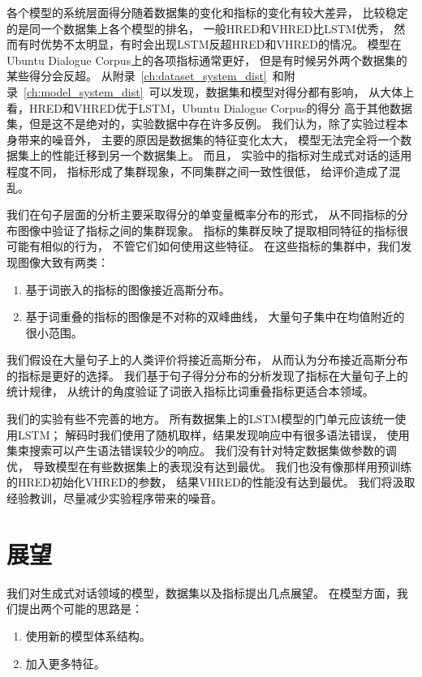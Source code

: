 各个模型的系统层面得分随着数据集的变化和指标的变化有较大差异，
比较稳定的是同一个数据集上各个模型的排名，
一般HRED和VHRED比LSTM优秀，
然而有时优势不太明显，有时会出现LSTM反超HRED和VHRED的情况。
模型在Ubuntu Dialogue Corpus上的各项指标通常更好，
但是有时候另外两个数据集的某些得分会反超。
从附录~\ref{ch:dataset_system_dist}~和附录~\ref{ch:model_system_dist}~可以发现，数据集和模型对得分都有影响，
从大体上看，HRED和VHRED优于LSTM，Ubuntu Dialogue Corpus的得分
高于其他数据集，但是这不是绝对的，实验数据中存在许多反例。
我们认为，除了实验过程本身带来的噪音外，
主要的原因是数据集的特征变化太大，
模型无法完全将一个数据集上的性能迁移到另一个数据集上。
而且，
实验中的指标对生成式对话的适用程度不同，
指标形成了集群现象，不同集群之间一致性很低，
给评价造成了混乱。

我们在句子层面的分析主要采取得分的单变量概率分布的形式，
从不同指标的分布图像中验证了指标之间的集群现象。
指标的集群反映了提取相同特征的指标很可能有相似的行为，
不管它们如何使用这些特征。
在这些指标的集群中，我们发现图像大致有两类：
\begin{enumerate}
    \item 基于词嵌入的指标的图像接近高斯分布。
    \item 基于词重叠的指标的图像是不对称的双峰曲线，
    大量句子集中在均值附近的很小范围。
\end{enumerate}
我们假设在大量句子上的人类评价将接近高斯分布，
从而认为分布接近高斯分布的指标是更好的选择。
我们基于句子得分分布的分析发现了指标在大量句子上的统计规律，
从统计的角度验证了词嵌入指标比词重叠指标更适合本领域。

我们的实验有些不完善的地方。
所有数据集上的LSTM模型的门单元应该统一使用LSTM；
解码时我们使用了随机取样，结果发现响应中有很多语法错误，
使用集束搜索可以产生语法错误较少的响应。
我们没有针对特定数据集做参数的调优，
导致模型在有些数据集上的表现没有达到最优。
我们也没有像\cite{VHRED}那样用预训练的HRED初始化VHRED的参数，
结果VHRED的性能没有达到最优。
我们将汲取经验教训，尽量减少实验程序带来的噪音。

\section{展望}\label{sec:future_work}
我们对生成式对话领域的模型，数据集以及指标提出几点展望。
在模型方面，我们提出两个可能的思路是：
\begin{enumerate}
    \item 使用新的模型体系结构。
    \item 加入更多特征。
\end{enumerate}

